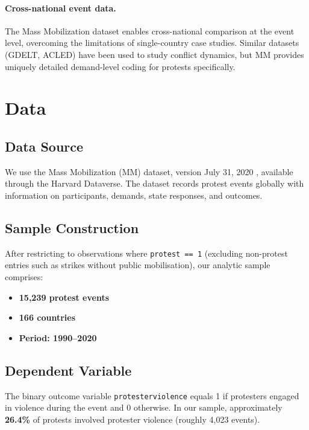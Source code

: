\documentclass[12pt,a4paper]{article}
\begin{document}
\paragraph{Cross-national event data.}
The Mass Mobilization dataset \citep{clark2020mass} enables cross-national comparison at the event level, overcoming the limitations of single-country case studies. Similar datasets (GDELT, ACLED) have been used to study conflict dynamics, but MM provides uniquely detailed demand-level coding for protests specifically.

\section{Data}

\subsection{Data Source}

We use the Mass Mobilization (MM) dataset, version July 31, 2020 \citep{clark2020mass}, available through the Harvard Dataverse. The dataset records protest events globally with information on participants, demands, state responses, and outcomes.

\subsection{Sample Construction}

After restricting to observations where \texttt{protest == 1} (excluding non-protest entries such as strikes without public mobilisation), our analytic sample comprises:
\begin{itemize}
  \item \textbf{15,239 protest events}
  \item \textbf{166 countries}
  \item \textbf{Period: 1990--2020}
\end{itemize}

\subsection{Dependent Variable}

The binary outcome variable \texttt{protesterviolence} equals 1 if protesters engaged in violence during the event and 0 otherwise. In our sample, approximately \textbf{26.4\%} of protests involved protester violence (roughly 4,023 events).
\end{document}
